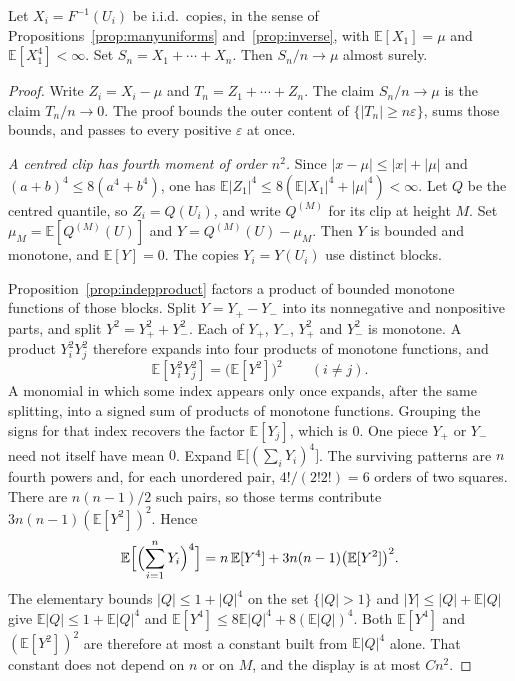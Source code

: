 \begin{theorem}\label{thm:slln4}
Let $X_i=F^{-1}(U_i)$ be i.i.d.\ copies, in the sense of Propositions~\ref{prop:manyuniforms} and~\ref{prop:inverse}, with $\mathbb E[X_1]=\mu$ and $\mathbb E[X_1^4]<\infty$. Set $S_n=X_1+\cdots+X_n$. Then $S_n/n\to\mu$ almost surely.
\end{theorem}
\begin{proof}
Write $Z_i=X_i-\mu$ and $T_n=Z_1+\cdots+Z_n$. The claim $S_n/n\to\mu$ is the claim $T_n/n\to0$. The proof bounds the outer content of $\{|T_n|\ge n\varepsilon\}$, sums those bounds, and passes to every positive $\varepsilon$ at once.

\emph{A centred clip has fourth moment of order $n^2$.} Since $|x-\mu|\le|x|+|\mu|$ and $(a+b)^4\le8(a^4+b^4)$, one has $\mathbb E|Z_1|^4\le8(\mathbb E|X_1|^4+|\mu|^4)<\infty$. Let $Q$ be the centred quantile, so $Z_i=Q(U_i)$, and write $Q^{(M)}$ for its clip at height $M$. Set $\mu_M=\mathbb E[Q^{(M)}(U)]$ and $Y=Q^{(M)}(U)-\mu_M$. Then $Y$ is bounded and monotone, and $\mathbb E[Y]=0$. The copies $Y_i=Y(U_i)$ use distinct blocks.

Proposition~\ref{prop:indepproduct} factors a product of bounded monotone functions of those blocks. Split $Y=Y_+-Y_-$ into its nonnegative and nonpositive parts, and split $Y^2=Y_+^2+Y_-^2$. Each of $Y_+$, $Y_-$, $Y_+^2$ and $Y_-^2$ is monotone. A product $Y_i^2 Y_j^2$ therefore expands into four products of monotone functions, and
\[
 \mathbb E[Y_i^2 Y_j^2]=\bigl(\mathbb E[Y^2]\bigr)^2\qquad(i\ne j).
\]
A monomial in which some index appears only once expands, after the same splitting, into a signed sum of products of monotone functions. Grouping the signs for that index recovers the factor $\mathbb E[Y_j]$, which is $0$. One piece $Y_+$ or $Y_-$ need not itself have mean $0$. Expand $\mathbb E\bigl[(\sum_i Y_i)^4\bigr]$. The surviving patterns are $n$ fourth powers and, for each unordered pair, $4!/(2!2!)=6$ orders of two squares. There are $n(n-1)/2$ such pairs, so those terms contribute $3n(n-1)(\mathbb E[Y^2])^2$. Hence
\[
 \mathbb E\Bigl[\Bigl(\sum_{i=1}^n Y_i\Bigr)^4\Bigr]
 =n\,\mathbb E[Y^4]+3n(n-1)\bigl(\mathbb E[Y^2]\bigr)^2.
\]
The elementary bounds $|Q|\le1+|Q|^4$ on the set $\{|Q|>1\}$ and $|Y|\le|Q|+\mathbb E|Q|$ give $\mathbb E|Q|\le1+\mathbb E|Q|^4$ and $\mathbb E[Y^4]\le8\mathbb E|Q|^4+8(\mathbb E|Q|)^4$. Both $\mathbb E[Y^4]$ and $(\mathbb E[Y^2])^2$ are therefore at most a constant built from $\mathbb E|Q|^4$ alone. That constant does not depend on $n$ or on $M$, and the display is at most $Cn^2$.


\end{proof}
